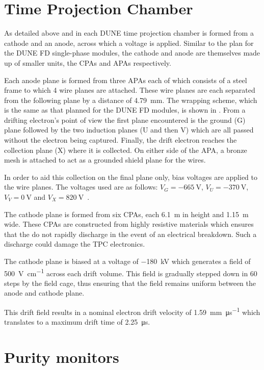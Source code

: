 \section{Time Projection Chamber}
\label{sec:protodune:tpc}

As detailed above and in  each DUNE time projection chamber is formed from a cathode and an anode, across which a voltage is applied.
Similar to the plan for the DUNE FD single-phase modules, the cathode and anode are themselves made up of smaller units, the CPAs and APAs respectively.

Each anode plane is formed from three APAs each of which consists of a steel frame to which 4 wire planes are attached.
These wire planes are each separated from the following plane by a distance of \SI{4.79}{\mm}.
The wrapping scheme, which is the same as that planned for the DUNE FD modules, is shown in .
From a drifting electron's point of view the first plane encountered is the ground (G) plane followed by the two induction planes (U and then V) which are all passed without the electron being captured.
Finally, the drift electron reaches the collection plane (X) where it is collected.
On either side of the APA, a bronze mesh is attached to act as a grounded shield plane for the wires.

In order to aid this collection on the final plane only, bias voltages are applied to the wire planes.
The voltages used are as follows: $V_{G} = \SI{-665}{\volt}$, $V_{U} = \SI{-370}{\volt}$, $V_{V} = \SI{0}{\volt}$ and $V_{X} = \SI{+820}{\volt}$~\cite{protodunePerformance}.

The cathode plane is formed from six CPAs, each \SI{6.1}{\m} in height and \SI{1.15}{\m} wide.
These CPAs are constructed from highly resistive materials which ensures that the do not rapidly discharge in the event of an electrical breakdown.
Such a discharge could damage the TPC electronics.

The cathode plane is biased at a voltage of \SI{-180}{\kilo\volt} which generates a field of \SI{500}{\volt\per\cm} across each drift volume.
This field is gradually stepped down in 60 steps by the field cage, thus ensuring that the field remains uniform between the anode and cathode plane.

This drift field results in a nominal electron drift velocity of \SI{1.59}{\mm\per\micro\second} which translates to a maximum drift time of \SI{2.25}{\micro\second}.

\section{Purity monitors}
\label{sec:protodune:prms}

